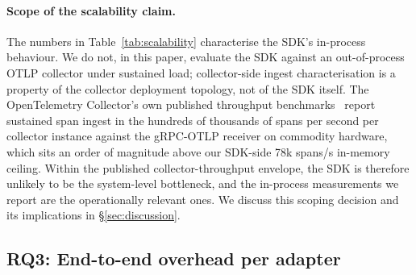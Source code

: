 \documentclass[sigconf,review,anonymous,9pt]{acmart}
\begin{document}
\paragraph{Scope of the scalability claim.}
The numbers in Table~\ref{tab:scalability} characterise the SDK's
in-process behaviour. We do not, in this paper, evaluate the SDK
against an out-of-process OTLP collector under sustained load;
collector-side ingest characterisation is a property of the
collector deployment topology, not of the SDK itself. The
OpenTelemetry Collector's own published throughput
benchmarks~\cite{otel_collector_perf} report sustained span ingest
in the hundreds of thousands of spans per second per collector
instance against the gRPC-OTLP receiver on commodity hardware,
which sits an order of magnitude above our SDK-side 78k spans/s
in-memory ceiling. Within the published collector-throughput
envelope, the SDK is therefore unlikely to be the system-level
bottleneck, and the in-process measurements we report are the
operationally relevant ones. We discuss this scoping decision and
its implications in \S\ref{sec:discussion}.

\subsection{RQ3: End-to-end overhead per adapter}
\end{document}
